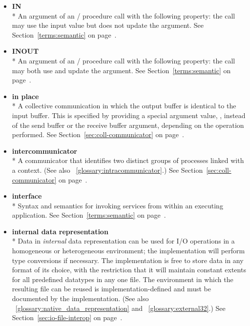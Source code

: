 \begin{itemize}
\label{glossary:IN}
\item \textbf{ IN} \\*
An argument of an \MPI/ procedure call with the following property: the call may use the input value but does 
not update the argument.
See Section~\ref{terms:semantic} on page~\pageref{terms:semantic}.

\label{glossary:INOUT}
\item \textbf{ INOUT} \\*
An argument of an \MPI/ procedure call with the following property: the call may both use and update the argument.
See Section~\ref{terms:semantic} on page~\pageref{terms:semantic}.

\label{glossary:in_place}
\item \textbf{ in place} \\*
A collective communication in which the output
buffer is identical to the input buffer.  This is specified by
providing a special argument value, , instead of the
send buffer or the receive buffer argument,
depending on the operation performed. 
See Section~\ref{sec:coll-communicator} on page~\pageref{sec:coll-communicatorr}.

\label{glossary:intercommunicator}
\item \textbf{ intercommunicator} \\*
A communicator that identifies two distinct groups of processes
linked with a context.  (See also ~\ref{glossary:intracommunicator}.)
See Section~\ref{sec:coll-communicator} on page~\pageref{sec:coll-communicator}.

\label{glossary:interface}
\item \textbf{ interface} \\* 
Syntax and semantics for invoking services from within an executing application.  
See Section~\ref{terms:semantic} on page~\pageref{terms:semantic}.

\label{glossary:internal_data_representation}
\item \textbf{ internal data representation} \\* 
Data in \emph{internal} data representation can be used for I/O operations in a homogeneous or
heterogeneous environment; the implementation will perform type
conversions if necessary. The implementation is free to store data in
any format of its choice,
with the restriction that it will maintain constant extents
for all predefined datatypes in any one file.
The environment in which the resulting file 
can be reused is implementation-defined
and must be documented by the implementation.
(See also ~\ref{glossary:native_data_representation} and ~\ref{glossary:external32}.)
See Section~\ref{sec:io-file-interop} on page~\pageref{sec:io-file-interop}.


\end{itemize}
